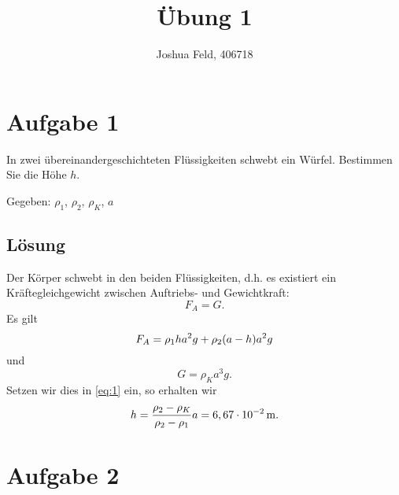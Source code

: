 \documentclass{exercise}
\institute{Lehrstuhl für Strömungslehre und Aerodynamisches Institut}
\title{Übung 1}
\author{Joshua Feld, 406718}
\begin{document}
    \maketitle


    \section*{Aufgabe 1}
    
    \begin{problem}
        In zwei übereinandergeschichteten Flüssigkeiten schwebt ein Würfel.
        Bestimmen Sie die Höhe \(h\).
        \begin{center}
        \end{center}
        Gegeben: \(\rho_1\), \(\rho_2\), \(\rho_K\), \(a\)
    \end{problem}
    
    \subsection*{Lösung}
    Der Körper schwebt in den beiden Flüssigkeiten, d.h. es existiert ein Kräftegleichgewicht zwischen Auftriebs- und Gewichtkraft:
    \begin{equation}\label{eq:1}
        F_A = G.
    \end{equation}
    Es gilt
    \[
        F_A = \rho_1 ha^2 g + \rho_2\parentheses*{a - h}a^2 g
    \]
    und
    \[
        G = \rho_K a^3 g.
    \]
    Setzen wir dies in \eqref{eq:1} ein, so erhalten wir
    \[
        h = \frac{\rho_2 - \rho_K}{\rho_2 - \rho_1}a = 6,67 \cdot 10^{-2}\,\si{\meter}.
    \]


    \section*{Aufgabe 2}
    
\end{document}
